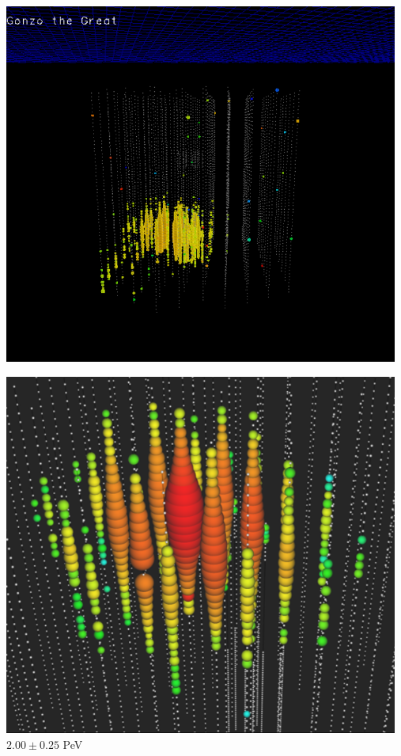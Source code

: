 \newpage

\begin{center}
\includegraphics[keepaspectratio,width=13cm]{gonzo-the-great}
\end{center}

\Tr
{}%
\begin{center}
\includegraphics[keepaspectratio,width=13cm]{big-bird}\\
$2.00 \pm 0.25$ PeV
\end{center}

